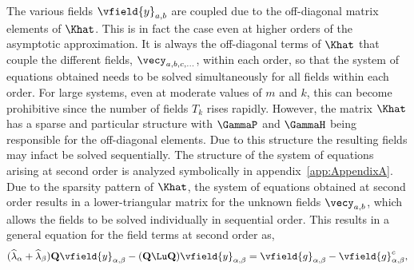 The various fields $\vfield{y}_{a,b}$ are coupled due to the off-diagonal matrix elements of $\Khat$. This is in fact the case even at higher orders of the asymptotic approximation. It is always the off-diagonal terms of $\Khat$ that couple the different fields, $\vecy_{a,b,c,\ldots}$, within each order, so that the system of equations obtained needs to be solved simultaneously for all fields within each order. For large systems, even at moderate values of $m$ and $k$, this can become prohibitive since the number of fields $T_{k}$ rises rapidly. However, the matrix $\Khat$ has a sparse and particular structure with $\GammaP$ and $\GammaH$ being responsible for the off-diagonal elements. Due to this structure the resulting fields may infact be solved sequentially. The structure of the system of equations arising at second order is analyzed symbolically in appendix~\ref{app:AppendixA}. Due to the sparsity pattern of $\Khat$, the system of equations obtained at second order results in a lower-triangular matrix for the unknown fields $\vecy_{a,b}$, which allows the fields to be solved individually in sequential order. This results in a general equation for the field terms at second order as,
\begin{align}
	(\widehat{\lambda}_{\alpha} + \widehat{\lambda}_{\beta})\mathbf{Q}\vfield{y}_{\alpha,\beta} 
	- (\mathbf{Q}\Lu\mathbf{Q})\vfield{y}_{\alpha,\beta} = \vfield{g}_{\alpha,\beta} - \vfield{g}^{c}_{\alpha,\beta}, \nonumber
\end{align}
